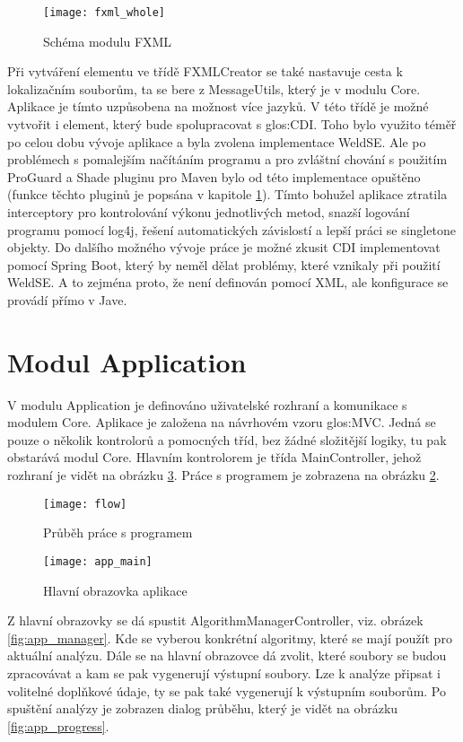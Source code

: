 \begin{figure}[h]
	\texttt{[image: fxml\_whole]}
	\centering
	\caption{Schéma modulu FXML \label{fig:fxml_whole}}
\end{figure} 
\FloatBarrier

Při vytváření elementu ve třídě FXMLCreator se také nastavuje cesta k lokalizačním souborům, ta se bere z MessageUtils, který je v modulu Core. Aplikace je tímto uzpůsobena na možnost více jazyků. V této třídě je možné vytvořit i element, který bude spolupracovat s \gls{glos:CDI}. Toho bylo využito téměř po celou dobu vývoje aplikace a byla zvolena implementace WeldSE. Ale po problémech s pomalejším načítáním programu a pro zvláštní chování s použitím ProGuard a Shade pluginu pro Maven bylo od této implementace opuštěno (funkce těchto pluginů je popsána v kapitole \ref{sec:app}). Tímto bohužel aplikace ztratila interceptory pro kontrolování výkonu jednotlivých metod, snazší logování programu pomocí log4j, řešení automatických závislostí a lepší práci se singletone objekty. Do dalšího možného vývoje práce je možné zkusit CDI implementovat pomocí Spring Boot, který by neměl dělat problémy, které vznikaly při použití WeldSE. A to zejména proto, že není definován pomocí XML, ale konfigurace se provádí přímo v Jave.

\section{Modul Application}\label{sec:app}
V modulu Application je definováno uživatelské rozhraní a komunikace s modulem Core. Aplikace je založena na návrhovém vzoru \gls{glos:MVC}. Jedná se pouze o několik kontrolorů a pomocných tříd, bez žádné složitější logiky, tu pak obstarává modul Core. Hlavním kontrolorem je třída MainController, jehož rozhraní je vidět na obrázku \ref{fig:app_main}. Práce s programem je zobrazena na obrázku \ref{fig:flow}.

\begin{figure}[h]
	\texttt{[image: flow]}
	\centering
	\caption{Průběh práce s programem \label{fig:flow}}
\end{figure} 
\FloatBarrier

\begin{figure}[h]
	\texttt{[image: app\_main]}
	\centering
	\caption{Hlavní obrazovka aplikace \label{fig:app_main}}
\end{figure} 
\FloatBarrier


Z hlavní obrazovky se dá spustit AlgorithmManagerController, viz. obrázek \ref{fig:app_manager}. Kde se vyberou konkrétní algoritmy, které se mají použít pro aktuální analýzu. Dále se na hlavní obrazovce dá zvolit, které soubory se budou zpracovávat a kam se pak vygenerují výstupní soubory. Lze k analýze připsat i volitelné doplňkové údaje, ty se pak také vygenerují k výstupním souborům. Po spuštění analýzy je zobrazen dialog průběhu, který je vidět na obrázku \ref{fig:app_progress}.

